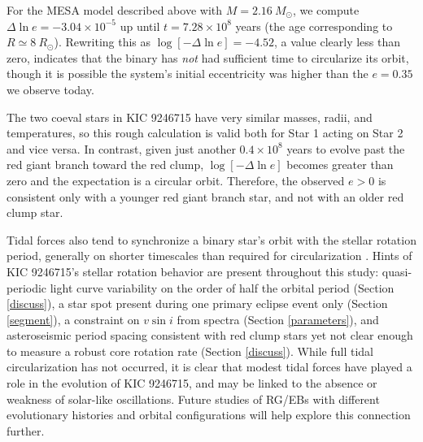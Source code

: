 For the MESA model described above with $M = 2.16 \ M_{\odot}$, we compute $\Delta \ln e = -3.04 \times 10^{-5}$ up until $t = 7.28 \times 10^8$ years (the age corresponding to $R \simeq 8 \ R_{\odot}$). Rewriting this as $\log [-\Delta \ln e] = -4.52$, a value clearly less than zero, indicates that the binary has \emph{not} had sufficient time to circularize its orbit, though it is possible the system's initial eccentricity was higher than the $e = 0.35$ we observe today.

The two coeval stars in KIC 9246715 have very similar masses, radii, and temperatures, so this rough calculation is valid both for Star 1 acting on Star 2 and vice versa. In contrast, given just another $0.4 \times 10^8$ years to evolve past the red giant branch toward the red clump, $\log [-\Delta \ln e]$ becomes greater than zero and the expectation is a circular orbit. Therefore, the observed $e > 0$ is consistent only with a younger red giant branch star, and not with an older red clump star.

Tidal forces also tend to synchronize a binary star's orbit with the stellar rotation period, generally on shorter timescales than required for circularization \citep{ogi14}. Hints of KIC 9246715's stellar rotation behavior are present throughout this study: quasi-periodic light curve variability on the order of half the orbital period (Section \ref{discuss}), a star spot present during one primary eclipse event only (Section \ref{segment}), a constraint on $v \sin i$ from spectra (Section \ref{parameters}), and asteroseismic period spacing consistent with red clump stars yet not clear enough to measure a robust core rotation rate (Section \ref{discuss}). While full tidal circularization has not occurred, it is clear that modest tidal forces have played a role in the evolution of KIC 9246715, and may be linked to the absence or weakness of solar-like oscillations. Future studies of RG/EBs with different evolutionary histories and orbital configurations will help explore this connection further.

  